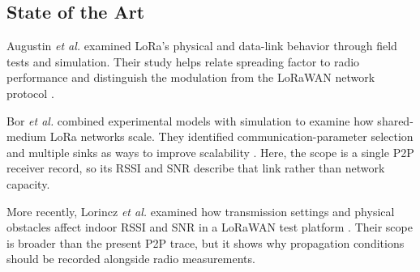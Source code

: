 \subsection{State of the Art}
Augustin \emph{et al.} examined LoRa's physical and data-link behavior through field tests and simulation. Their study helps relate spreading factor to radio performance and distinguish the modulation from the LoRaWAN network protocol \cite{augustin2016}.

Bor \emph{et al.} combined experimental models with simulation to examine how shared-medium LoRa networks scale. They identified communication-parameter selection and multiple sinks as ways to improve scalability \cite{bor2016}. Here, the scope is a single P2P receiver record, so its RSSI and SNR describe that link rather than network capacity.

More recently, Lorincz \emph{et al.} examined how transmission settings and physical obstacles affect indoor RSSI and SNR in a LoRaWAN test platform \cite{lorincz2025}. Their scope is broader than the present P2P trace, but it shows why propagation conditions should be recorded alongside radio measurements.
